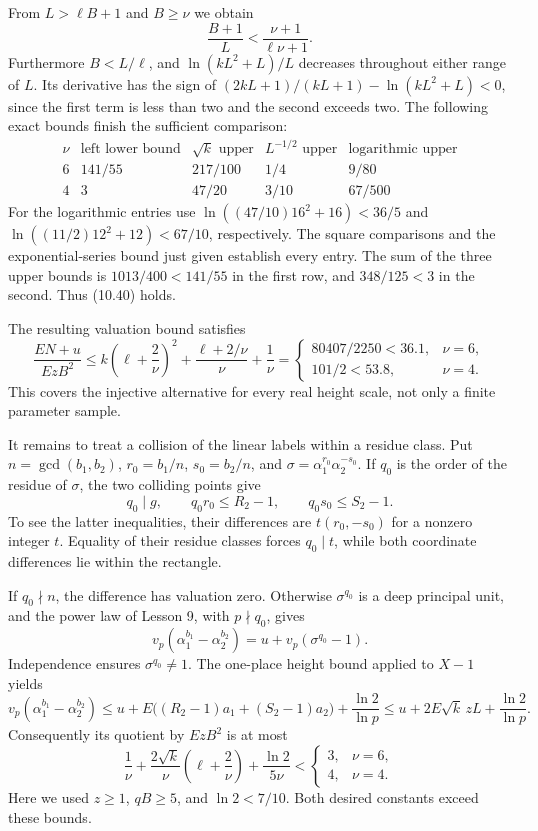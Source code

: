 \documentclass[
  11pt,
  a4paper,
]{article}
\begin{document}
From \(L>\ell B+1\) and \(B\ge\nu\) we obtain \[
\frac{B+1}{L}<\frac{\nu+1}{\ell\nu+1}.
\tag{10.566}
\] Furthermore \(B<L/\ell\), and \(\ln(kL^2+L)/L\) decreases throughout
either range of \(L\). Its derivative has the sign of
\((2kL+1)/(kL+1)-\ln(kL^2+L)<0\), since the first term is less than two
and the second exceeds two. The following exact bounds finish the
sufficient comparison: \[
\begin{array}{c|c|c|c|c}
\nu&\text{left lower bound}&\sqrt{k}\text{ upper}
&L^{-1/2}\text{ upper}&\text{logarithmic upper}\\ \hline
6&141/55&217/100&1/4&9/80\\
4&3&47/20&3/10&67/500
\end{array}
\tag{10.567}
\] For the logarithmic entries use \(\ln((47/10)16^2+16)<36/5\) and
\(\ln((11/2)12^2+12)<67/10\), respectively. The square comparisons and
the exponential-series bound just given establish every entry. The sum
of the three upper bounds is \(1013/400<141/55\) in the first row, and
\(348/125<3\) in the second. Thus (10.40) holds.

The resulting valuation bound satisfies \[
\frac{EN+u}{EzB^2}
\le k\left(\ell+\frac2\nu\right)^2
\mathbin{+}\frac{\ell+2/\nu}{\nu}+\frac1\nu
\mathrel{=}
\begin{cases}
80407/2250<36.1,&\nu=6,\\
101/2<53.8,&\nu=4.
\end{cases}
\tag{10.568}
\] This covers the injective alternative for every real height scale,
not only a finite parameter sample.

It remains to treat a collision of the linear labels within a residue
class. Put \(n=\gcd(b_1,b_2)\), \(r_0=b_1/n\), \(s_0=b_2/n\), and
\(\sigma=\alpha_1^{r_0}\alpha_2^{-s_0}\). If \(q_0\) is the order of the
residue of \(\sigma\), the two colliding points give \[
q_0\mid g,\qquad q_0r_0\le R_2-1,\qquad
q_0s_0\le S_2-1.
\tag{10.569}
\] To see the latter inequalities, their differences are \(t(r_0,-s_0)\)
for a nonzero integer \(t\). Equality of their residue classes forces
\(q_0\mid t\), while both coordinate differences lie within the
rectangle.

If \(q_0\nmid n\), the difference has valuation zero. Otherwise
\(\sigma^{q_0}\) is a deep principal unit, and the power law of Lesson
9, with \(p\nmid q_0\), gives \[
v_p(\alpha_1^{b_1}-\alpha_2^{b_2})
=u+v_p(\sigma^{q_0}-1).
\tag{10.570}
\] Independence ensures \(\sigma^{q_0}\ne1\). The one-place height bound
applied to \(X-1\) yields \[
v_p(\alpha_1^{b_1}-\alpha_2^{b_2})
\le u+E\bigl((R_2-1)a_1+(S_2-1)a_2\bigr)
\mathbin{+}\frac{\ln2}{\ln p}
\le u+2E\sqrt{k}\,zL+\frac{\ln2}{\ln p}.
\tag{10.571}
\] Consequently its quotient by \(EzB^2\) is at most \[
\frac1\nu+
\frac{2\sqrt{k}}{\nu}\left(\ell+\frac2\nu\right)
\mathbin{+}\frac{\ln2}{5\nu}
<\begin{cases}3,&\nu=6,\\4,&\nu=4.\end{cases}
\tag{10.572}
\] Here we used \(z\ge1\), \(qB\ge5\), and \(\ln2<7/10\). Both desired
constants exceed these bounds.
\end{document}
